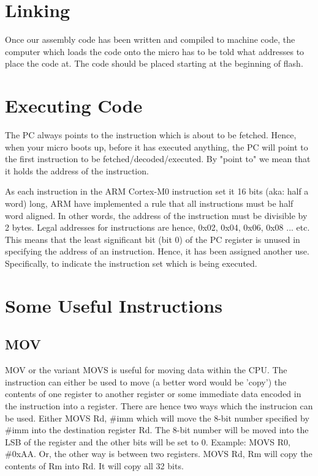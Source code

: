 \section{Linking}
Once our assembly code has been written and compiled to machine code, the computer which loads the code onto the micro has to be told what addresses to place the code at. The code should be placed starting at the beginning of flash.

\section{Executing Code}
The PC always points to the instruction which is about to be fetched. Hence, when your micro boots up, before it has executed anything, the PC will point to the first instruction to be fetched/decoded/executed. By "point to" we mean that it holds the address of the instruction. 

As each instruction in the ARM Cortex-M0 instruction set it 16 bits (aka: half a word) long, ARM have implemented a rule that all instructions must be half word aligned. In other words, the address of the instruction must be divisible by 2 bytes. Legal addresses for instructions are hence, 0x02, 0x04, 0x06, 0x08 ... etc. 
This means that the least significant bit (bit 0) of the PC register is unused in specifying the address of an instruction. 
Hence, it has been assigned another use. Specifically, to indicate the instruction set which is being executed. 

\section{Some Useful Instructions}
\subsection{MOV}
MOV or the variant MOVS is useful for moving data within the CPU. The instruction can either be used to move (a better word would be 'copy') the contents of one register to another register or some immediate data encoded in the instruction into a register. There are hence two ways which the instrucion can be used. Either MOVS Rd, \#imm which will move the 8-bit number specified by \#imm into the destination register Rd. The 8-bit number will be moved into the LSB of the register and the other bits will be set to 0. Example: MOVS R0, \#0xAA. Or, the other way is between two registers. MOVS Rd, Rm will copy the contents of Rm into Rd. It will copy all 32 bits.

